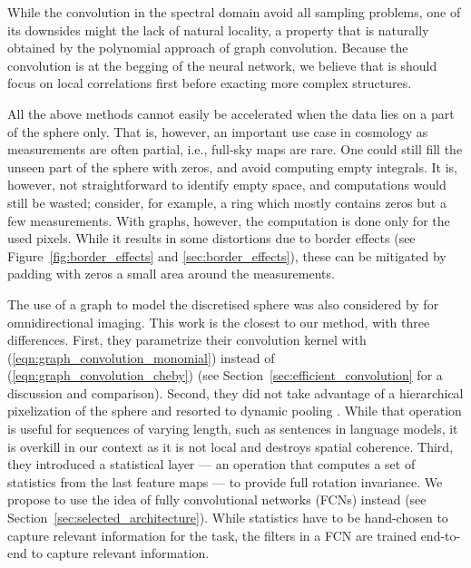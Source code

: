 \documentclass[final,twocolumn,3p,times,authoryear]{elsarticle}
\newcommand{\todo}[1]{{\color[rgb]{.6,.1,.6}{#1}}}
\newcommand{\figref}[1]{Figure~\ref{fig:#1}}
\newcommand{\secref}[1]{Section~\ref{sec:#1}}
\newcommand{\eqnref}[1]{(\ref{eqn:#1})}
\newcommand{\1}{\b{1}}              %
\newcommand{\0}{\b{0}}              %
\begin{document}
While the convolution in the spectral domain avoid all sampling problems, one of its downsides might the lack of natural locality, a property that is naturally obtained by the polynomial approach of graph convolution. Because the convolution is at the begging of the neural network, we believe that is should focus on local correlations first before exacting more complex structures.

All the above methods cannot easily be accelerated when the data lies on a part of the sphere only.
That is, however, an important use case in cosmology as measurements are often partial, i.e., full-sky maps are rare.
One could still fill the unseen part of the sphere with zeros, and avoid computing empty integrals.
It is, however, not straightforward to identify empty space, and computations would still be wasted; consider, for example, a ring which mostly contains zeros but a few measurements.
With graphs, however, the computation is done only for the used pixels.
While it results in some distortions due to border effects (see \figref{border_effects} and \ref{sec:border_effects}), these can be mitigated by padding with zeros a small area around the measurements.

The use of a graph to model the discretised sphere was also considered by \citet{khasanova2017graphomni} for omnidirectional imaging.
This work is the closest to our method, with three differences. First, they parametrize their convolution kernel with \eqnref{graph_convolution_monomial} instead of \eqnref{graph_convolution_cheby} (see \secref{efficient_convolution} for a discussion and comparison).
Second, they did not take advantage of a hierarchical pixelization of the sphere and resorted to dynamic pooling \citep{kalchbrenner2014dcnn}. While that operation is useful for sequences of varying length, such as sentences in language models, it is overkill in our context as it is not local and destroys spatial coherence.
Third, they introduced a statistical layer --- an operation that computes a set of statistics from the last feature maps --- to provide full rotation invariance. We propose to use the idea of fully convolutional networks (FCNs) instead (see \secref{selected_architecture}). While statistics have to be hand-chosen to capture relevant information for the task, the filters in a FCN are trained end-to-end to capture relevant information.
\end{document}
